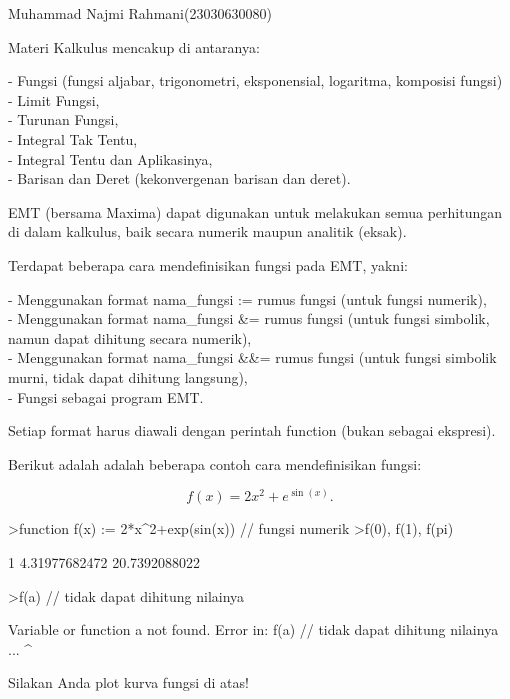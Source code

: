 \documentclass[a4paper,10pt]{article}
\begin{document}
\begin{eulernotebook}
\begin{eulercomment}
Muhammad Najmi Rahmani(23030630080)

Materi Kalkulus mencakup di antaranya:

- Fungsi (fungsi aljabar, trigonometri, eksponensial, logaritma,
komposisi fungsi)\\
- Limit Fungsi,\\
- Turunan Fungsi,\\
- Integral Tak Tentu,\\
- Integral Tentu dan Aplikasinya,\\
- Barisan dan Deret (kekonvergenan barisan dan deret).

EMT (bersama Maxima) dapat digunakan untuk melakukan semua perhitungan
di dalam kalkulus, baik secara numerik maupun analitik (eksak).

\end{eulercomment}
\begin{eulercomment}
Terdapat beberapa cara mendefinisikan fungsi pada EMT, yakni:

- Menggunakan format nama\_fungsi := rumus fungsi (untuk fungsi
numerik),\\
- Menggunakan format nama\_fungsi \&= rumus fungsi (untuk fungsi
simbolik, namun dapat dihitung secara numerik),\\
- Menggunakan format nama\_fungsi \&\&= rumus fungsi (untuk fungsi
simbolik murni, tidak dapat dihitung langsung),\\
- Fungsi sebagai program EMT.

Setiap format harus diawali dengan perintah function (bukan sebagai
ekspresi).

Berikut adalah adalah beberapa contoh cara mendefinisikan fungsi:

\end{eulercomment}
\begin{eulerformula}
\[
f(x)=2x^2+e^{\sin(x)}.
\]
\end{eulerformula}
\begin{eulerprompt}
>function f(x) := 2*x^2+exp(sin(x)) // fungsi numerik
>f(0), f(1), f(pi)
\end{eulerprompt}
\begin{euleroutput}
  1
  4.31977682472
  20.7392088022
\end{euleroutput}
\begin{eulerprompt}
>f(a) // tidak dapat dihitung nilainya
\end{eulerprompt}
\begin{euleroutput}
  Variable or function a not found.
  Error in:
  f(a) // tidak dapat dihitung nilainya ...
     ^
\end{euleroutput}
\begin{eulercomment}
Silakan Anda plot kurva fungsi di atas!


\end{eulercomment}
\end{eulernotebook}
\end{document}
